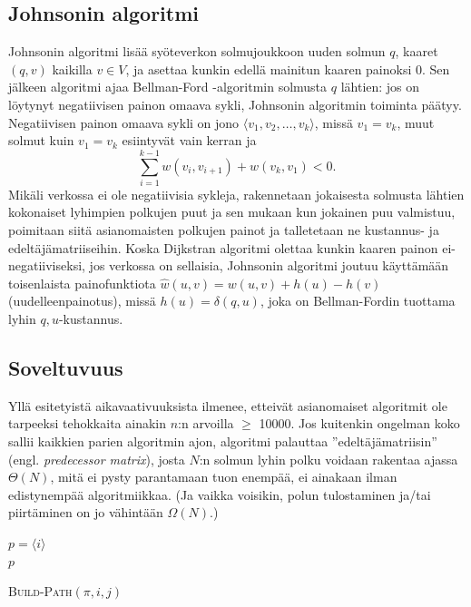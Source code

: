 \documentclass[finnish]{tktltiki2}
\newenvironment{finalgo}[1][htb]{
  \renewcommand{\algorithmcfname}{Algoritmi}
  \begin{algorithm}[#1]
}{\end{algorithm}}
\theoremstyle{definition}
\theoremstyle{remark}
\begin{document}
\subsection{Johnsonin algoritmi}
Johnsonin algoritmi lisää syöteverkon solmujoukkoon uuden solmun $q$, kaaret $(q, v)$ kaikilla $v \in V$, ja asettaa kunkin edellä mainitun kaaren painoksi 0. Sen jälkeen algoritmi ajaa Bellman-Ford -algoritmin solmusta $q$ lähtien: jos on löytynyt negatiivisen painon omaava sykli, Johnsonin algoritmin toiminta päätyy. 
Negatiivisen painon omaava sykli on jono $\langle v_1, v_2, \dots, v_k \rangle$, missä $v_1 = v_k$, muut solmut kuin $v_1 = v_k$ esiintyvät vain kerran ja 
\[
\sum_{i = 1}^{k - 1} w(v_i, v_{i +1}) + w(v_k, v_1) < 0.
\]
Mikäli verkossa ei ole negatiivisia sykleja, rakennetaan jokaisesta solmusta lähtien kokonaiset lyhimpien polkujen puut ja sen mukaan kun jokainen puu valmistuu, poimitaan siitä asianomaisten polkujen painot ja talletetaan ne kustannus- ja edeltäjämatriiseihin. Koska Dijkstran algoritmi olettaa kunkin kaaren painon ei-negatiiviseksi, jos verkossa on sellaisia, Johnsonin algoritmi joutuu käyttämään toisenlaista painofunktiota $\hat{w}(u, v) = w(u, v) + h(u) - h(v)$ (uudelleenpainotus), missä $h(u) = \delta(q, u)$, joka on Bellman-Fordin tuottama lyhin $q, u$-kustannus.

\subsection{Soveltuvuus}
Yllä esitetyistä aikavaativuuksista ilmenee, etteivät asianomaiset algoritmit ole tarpeeksi tehokkaita ainakin $n$:n arvoilla $\geq$ 10000. Jos kuitenkin ongelman koko sallii kaikkien parien algoritmin ajon, algoritmi palauttaa ''edeltäjämatriisin'' (engl. \textit{predecessor matrix}), josta $N$:n solmun lyhin polku voidaan rakentaa ajassa $\Theta(N)$, mitä ei pysty parantamaan tuon enempää, ei ainakaan ilman edistynempää algoritmiikkaa. (Ja vaikka voisikin, polun tulostaminen ja/tai piirtäminen on jo vähintään $\Omega(N)$.)
\begin{finalgo}[t]
$p = \langle i \rangle$ \\
\KwRet $p$ \\
\label{alg:buildpath}
\caption{\textsc{Build-Path}$(\pi, i, j)$}
\end{finalgo}
\end{document}
